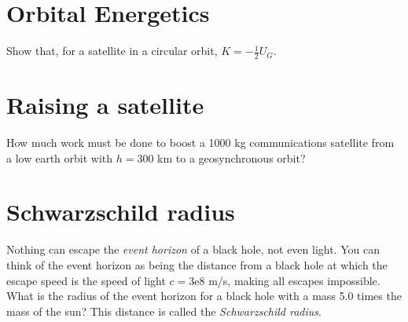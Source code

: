 \documentclass[11pt]{article}
\begin{document}
\section{Orbital Energetics}

Show that, for a satellite in a circular orbit, $K = -\frac{1}{2} U_G$.

\section{Raising a satellite}
How much work must be done to boost a 1000 kg communications satellite from a low earth orbit with $h = 300$ km to a geosynchronous orbit?



\section{Schwarzschild radius}

Nothing can escape the \textit{event horizon} of a black hole, not even light. You can think of the event horizon as being the distance from a black hole at which the escape speed is the speed of light $c = 3\text{e}8$ m/s, making all escapes impossible. What is the radius of the event horizon for a black hole with a mass 5.0 times the mass of the sun? This distance is called the \textit{Schwarzschild radius}.
\end{document}

